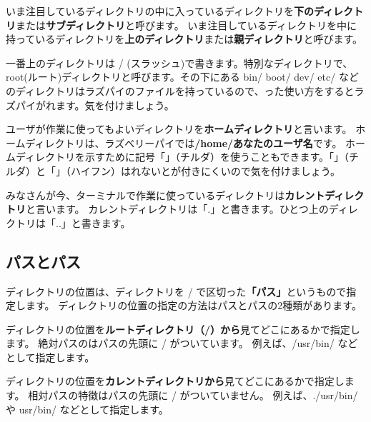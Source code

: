 \documentclass[text03.tex]{subfiles}
\begin{document}

いま注目しているディレクトリの中に入っているディレクトリを{\bf 下のディレクトリ}または{\bf サブディレクトリ}と呼びます。
いま注目しているディレクトリを中に持っているディレクトリを{\bf 上のディレクトリ}または{\bf 親ディレクトリ}と呼びます。


一番上のディレクトリは / (スラッシュ)で書きます。特別なディレクトリで、root(ルート)ディレクトリと呼びます。その下にある bin/ boot/ dev/ etc/ などのディレクトリはラズパイのファイルを持っているので、った使い方をするとラズパイがれます。気を付けましょう。


ユーザが作業に使ってもよいディレクトリを{\bf ホームディレクトリ}と言います。
ホームディレクトリは、ラズベリーパイでは{\bf /home/あなたのユーザ名}です。
ホームディレクトリを示すために記号「\code{\textasciitilde}」（チルダ）を使うこともできます。「\code{\textasciitilde}」（チルダ）と「\code{-}」（ハイフン）はれないとが付きにくいので気を付けましょう。


みなさんが今、ターミナルで作業に使っているディレクトリは{\bf カレントディレクトリ}と言います。
カレントディレクトリは「.」と書きます。ひとつ上のディレクトリは「..」と書きます。

\subsection{パスとパス}
ディレクトリの位置は、ディレクトリを / で区切った{\bf 「パス」}というもので指定します。
ディレクトリの位置の指定の方法はパスとパスの2種類があります。


ディレクトリの位置を{\bf ルートディレクトリ（/）から}見てどこにあるかで指定します。
絶対パスのはパスの先頭に / がついています。
例えば、/usr/bin/ などとして指定します。


ディレクトリの位置を{\bf カレントディレクトリから}見てどこにあるかで指定します。
相対パスの特徴はパスの先頭に / がついていません。
例えば、./usr/bin/ や usr/bin/ などとして指定します。
\end{document}
